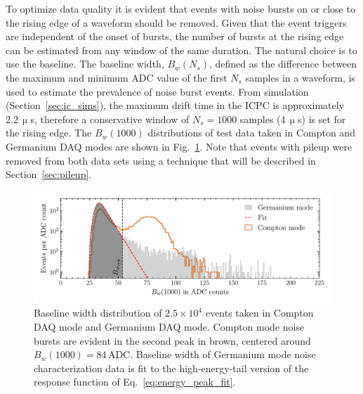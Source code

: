 To optimize data quality it is evident that events with noise bursts on or close to the rising edge of a waveform should be removed. Given that the event triggers are independent of the onset of bursts, the number of bursts at the rising edge can be estimated from any window of the same duration. The natural choice is to use the baseline. The baseline width, $B_w(N_s)$, defined as the difference between the maximum and minimum ADC value of the first $N_s$ samples in a waveform, is used to estimate the prevalence of noise burst events. From simulation (Section~\ref{sec:ic_sims}), the maximum drift time in the ICPC is approximately 2.2\,$\upmu$s, therefore a conservative window of $N_s = 1000$ samples (4\,$\upmu$s) is set for the rising edge. The $B_w(1000)$ distributions of test data taken in Compton and Germanium DAQ modes are shown in Fig.~\ref{fig:baseline_width_pre_optical}. Note that events with pileup were removed from both data sets using a technique that will be described in Section~\ref{sec:pileup}. 
\begin{figure}[htb]
    \centering
	\vspace*{-10pt}
    \includegraphics[width=6in]{figs/param/baseline_width_pre_optical_6_9in.pdf}
	\vspace*{-10mm}
    \caption{Baseline width distribution of $2.5\times10^4$ events taken in Compton DAQ mode and Germanium DAQ mode. Compton mode noise bursts are evident in the second peak in brown, centered around $B_w(1000) = 84\,\text{ADC}$. Baseline width of Germanium mode noise characterization data is fit to the high-energy-tail version of the response function of Eq.~\ref{eq:energy_peak_fit}.}
    \label{fig:baseline_width_pre_optical}
	\vspace*{-5pt}
\end{figure}

